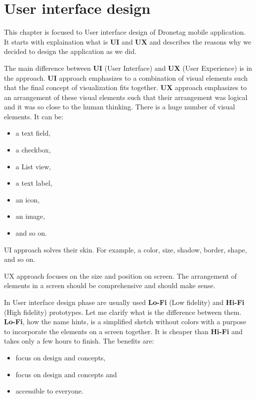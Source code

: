 \chapter{User interface design}\label{ch:user-interface-design}
This chapter is focused to User interface design of Dronetag mobile application.
It starts with explaination what is \textbf{UI} and \textbf{UX} and describes the reasons why we decided to design the application as we did.

The main difference between \textbf{UI} (User Interface) and \textbf{UX} (User Experience) is in the approach.
\textbf{UI} approach emphasizes to a combination of visual elements such that the final concept of visualization fits together.
\textbf{UX} approach emphasizes to an arrangement of these visual elements such that their arrangement was logical and it was so close to the human thinking.
There is a huge number of visual elements.
It can be:
\begin{itemize}
    \item a text field,
    \item a checkbox,
    \item a List view,
    \item a text label,
    \item an icon,
    \item an image,
    \item and so on.
\end{itemize}

UI approach solves their skin.
For example, a color, size, shadow, border, shape, and so on.

UX approach focuses on the size and position on screen.
The arrangement of elements in a screen should be comprehensive and should make sense.

In User interface design phase are usually used \textbf{Lo-Fi} (Low fidelity) and \textbf{Hi-Fi} (High fidelity) prototypes.
Let me clarify what is the difference between them.
\textbf{Lo-Fi}, how the name hints, is a simplified sketch without colors with a purpose to incorporate the elements on a screen together.
It is cheaper than \textbf{Hi-Fi} and takes only a few hours to finish.
The benefits are:
\begin{itemize}
    \item focus on design and concepts,
    \item focus on design and concepts and
    \item accessible to everyone.\cite{hiFiLoFiPrototypeArticle}
\end{itemize}

